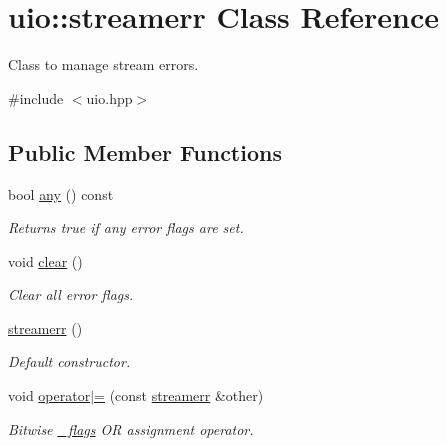\hypertarget{classuio_1_1streamerr}{}\section{uio\+:\+:streamerr Class Reference}
\label{classuio_1_1streamerr}


Class to manage stream errors.  




{\ttfamily \#include $<$uio.\+hpp$>$}

\subsection*{Public Member Functions}
\begin{DoxyCompactItemize}
\item 
bool \hyperlink{classuio_1_1streamerr_a489dbd90ff5840fa7ed3faf361f7e96e}{any} () const 
\begin{DoxyCompactList}\small\item\em Returns {\ttfamily true} if any error flags are set. \end{DoxyCompactList}\item 
void \hyperlink{classuio_1_1streamerr_adfb4269789a3552ec5c9a8bb00b1d30a}{clear} ()\hypertarget{classuio_1_1streamerr_adfb4269789a3552ec5c9a8bb00b1d30a}{}\label{classuio_1_1streamerr_adfb4269789a3552ec5c9a8bb00b1d30a}

\begin{DoxyCompactList}\small\item\em Clear all error flags. \end{DoxyCompactList}\item 
\hyperlink{classuio_1_1streamerr_a1274fd04b3fed5edf1e86f73811fb87e}{streamerr} ()\hypertarget{classuio_1_1streamerr_a1274fd04b3fed5edf1e86f73811fb87e}{}\label{classuio_1_1streamerr_a1274fd04b3fed5edf1e86f73811fb87e}

\begin{DoxyCompactList}\small\item\em Default constructor. \end{DoxyCompactList}\item 
void \hyperlink{classuio_1_1streamerr_ad4aac6b30724592b8cb15d3a5929e1c6}{operator$\vert$=} (const \hyperlink{classuio_1_1streamerr}{streamerr} \&other)\hypertarget{classuio_1_1streamerr_ad4aac6b30724592b8cb15d3a5929e1c6}{}\label{classuio_1_1streamerr_ad4aac6b30724592b8cb15d3a5929e1c6}

\begin{DoxyCompactList}\small\item\em Bitwise \hyperlink{classuio_1_1streamerr_add2fbb3ab5f357d618775d37e6f3201b}{\+\_\+flags} {\ttfamily OR} {\ttfamily assignment} {\ttfamily operator}. \end{DoxyCompactList}\end{DoxyCompactItemize}
